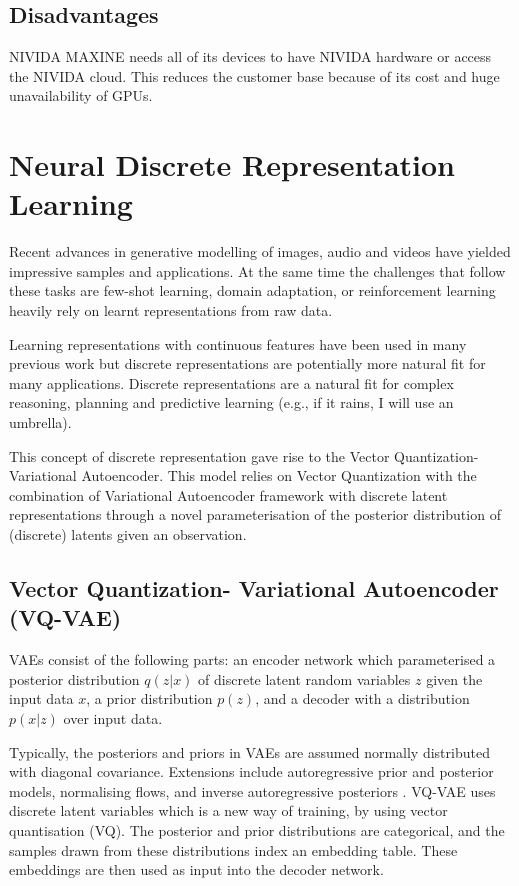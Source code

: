 \subsection{Disadvantages}

NIVIDA MAXINE needs all of its devices to have NIVIDA hardware or access the NIVIDA cloud. 
This reduces the customer base because of its cost and huge unavailability of GPUs.

\section{Neural Discrete Representation Learning}

Recent advances in generative modelling of images, audio and videos  have yielded impressive
samples and applications. At the same time the challenges that follow these tasks are few-shot
learning, domain adaptation, or reinforcement learning heavily rely on learnt representations from raw data.

Learning representations with continuous features have been used in many previous 
work but discrete representations  are potentially more natural fit for many applications. 
Discrete representations are a natural fit for complex reasoning, planning and predictive learning
(e.g., if it rains, I will use an umbrella).

This concept of discrete representation gave rise to the Vector Quantization-Variational Autoencoder. 
This model relies on Vector Quantization with the combination of Variational Autoencoder framework with 
discrete latent representations through a novel parameterisation of the posterior distribution of (discrete) 
latents given an observation.

\subsection{Vector Quantization- Variational Autoencoder (VQ-VAE)}

VAEs consist of the following parts: an encoder network which parameterised a posterior  
distribution $q(z|x)$ of discrete latent random variables $z$ given the input data $x$, a prior
distribution $p(z)$, and a decoder with a distribution $p(x|z)$ over input data.

Typically, the posteriors and priors in VAEs are assumed normally distributed with diagonal 
covariance. Extensions include autoregressive prior and posterior models, normalising flows, 
and inverse autoregressive posteriors . VQ-VAE uses discrete latent variables which is  
a new way of training, by using vector quantisation (VQ). The posterior and prior distributions are 
categorical, and the samples drawn from these distributions index an embedding table. These embeddings
are then used as input into the decoder network.

